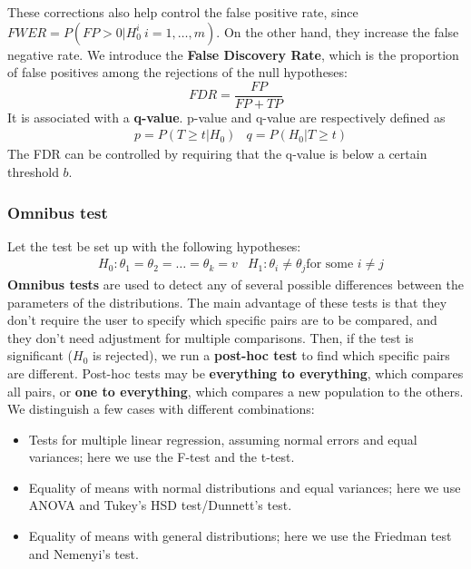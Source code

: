 These corrections also help control the false positive rate, since $FWER = P(FP > 0 | H_0^i \ i=1,\ldots,m)$. On the other hand, they increase the false negative rate. We introduce the \textbf{False Discovery Rate}, which is the proportion of false positives among the rejections of the null hypotheses:
\begin{equation*}
    FDR = \frac{FP}{FP + TP}
\end{equation*}
It is associated with a \textbf{q-value}. p-value and q-value are respectively defined as
\begin{align*}
    &p = P(T \geq t | H_0) &q = P(H_0 | T \geq t) 
\end{align*}
The FDR can be controlled by requiring that the q-value is below a certain threshold $b$.

\subsubsection{Omnibus test}
Let the test be set up with the following hypotheses:
\begin{align*}
    &H_0 : \theta_1 = \theta_2 = \ldots = \theta_k = v &H_1 : \theta_i \not = \theta_j \text{for some } i \not = j
\end{align*}
\textbf{Omnibus tests} are used to detect any of several possible differences between the parameters of the distributions. The main advantage of these tests is that they don't require the user to specify which specific pairs are to be compared, and they don't need adjustment for multiple comparisons. Then, if the test is significant ($H_0$ is rejected), we run a \textbf{post-hoc test} to find which specific pairs are different. Post-hoc tests may be \textbf{everything to everything}, which compares all pairs, or \textbf{one to everything}, which compares a new population to the others. We distinguish a few cases with different combinations:
\begin{itemize}
    \item Tests for multiple linear regression, assuming normal errors and equal variances; here we use the F-test and the t-test.
    \item Equality of means with normal distributions and equal variances; here we use ANOVA and Tukey's HSD test/Dunnett's test.
    \item Equality of means with general distributions; here we use the Friedman test and Nemenyi's test.
\end{itemize}

